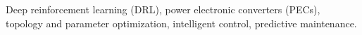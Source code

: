 \begin{IEEEkeywords}
Deep reinforcement learning (DRL), 
power electronic converters (PECs), 
topology and parameter optimization, 
intelligent control, 
predictive maintenance. 
\end{IEEEkeywords}
